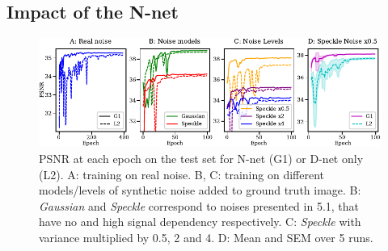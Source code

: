\documentclass{article}
\begin{document}
\subsection{Impact of the N-net}
\begin{figure}[ht]
\begin{center}
\centerline{\includegraphics[width=\columnwidth]{fig_convergence_1col.pdf}}
\caption{PSNR at each epoch on the test set for N-net (G1) or D-net only (L2). A: training on real noise. B, C: training on different models/levels of synthetic noise added to ground truth image. B: \textit{Gaussian} and \textit{Speckle} correspond to noises presented in 5.1, that have no and high signal dependency respectively. C: \textit{Speckle} with variance multiplied by 0.5, 2 and 4. D: Mean and SEM over 5 runs.}
\label{si:fig:convergence}
\end{center}
\end{figure}
\end{document}
